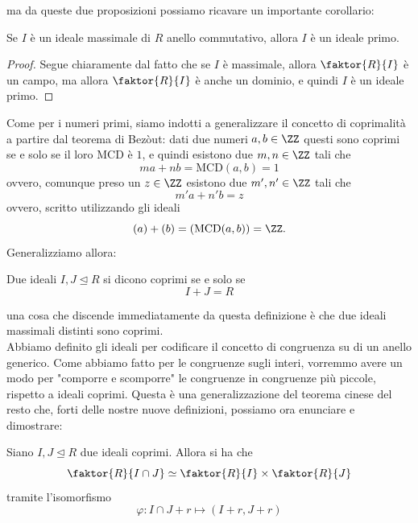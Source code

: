 \documentclass[11pt]{scrartcl}
\newcommand{\MCD}{\text{MCD}}
\newcommand{\normal}{\mathrel{\unlhd}}
\begin{document}
	ma da queste due proposizioni possiamo ricavare un importante corollario:
	\begin{corollary}
		Se $I$ è un ideale massimale di $R$ anello commutativo, allora $I$ è un ideale primo.
	\end{corollary}
	\begin{proof}
		Segue chiaramente dal fatto che se $I$ è massimale, allora $\faktor{R}{I}$ è un campo, ma allora $\faktor{R}{I}$ è anche un dominio, e quindi $I$ è un ideale primo.
	\end{proof}
	Come per i numeri primi, siamo indotti a generalizzare il concetto di coprimalità a partire dal teorema di Bezòut: dati due numeri $a,b\in\ZZ$ questi sono coprimi se e solo se il loro MCD è $1$, e quindi esistono due $m,n\in\ZZ$ tali che
	$$ma+nb=\MCD(a,b)=1$$
	ovvero, comunque preso un $z\in\ZZ$ esistono due $m',n'\in\ZZ$ tali che 
	$$m'a+n'b=z$$
	ovvero, scritto utilizzando gli ideali
	$$(a)+(b)=(\MCD(a,b))=\ZZ.$$
	Generalizziamo allora:
	\begin{definition}
		Due ideali $I,J\normal R$ si dicono coprimi se e solo se 
		$$I+J=R$$
	\end{definition}
	una cosa che discende immediatamente da questa definizione è che due ideali massimali distinti sono coprimi. \\
	Abbiamo definito gli ideali per codificare il concetto di congruenza su di un anello generico. Come abbiamo fatto per le congruenze sugli interi, vorremmo avere un modo per "comporre e scomporre" le congruenze in congruenze più piccole, rispetto a ideali coprimi. Questa è una generalizzazione del teorema cinese del resto che, forti delle nostre nuove definizioni, possiamo ora enunciare e dimostrare:
	\begin{theorem}
		Siano $I,J\normal R$ due ideali coprimi. Allora si ha che 
		$$\faktor{R}{I\cap J}\simeq \faktor{R}{I}\times \faktor{R}{J}$$
		tramite l'isomorfismo
		$$\varphi:I\cap J+r\mapsto (I+r,J+r)$$
	\end{theorem}
\end{document}
